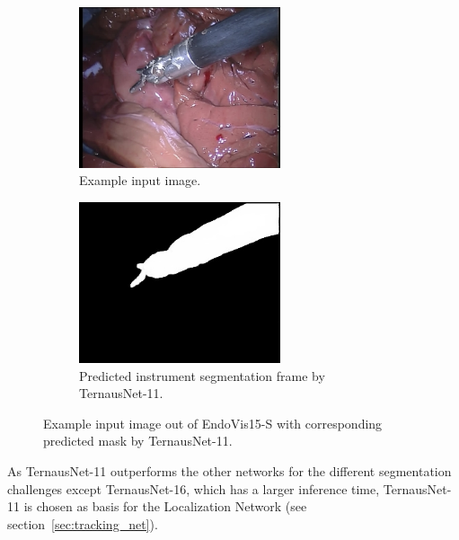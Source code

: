 \begin{figure}
\centering
\begin{subfigure}[t]{0.49\textwidth}
	\centering
	\includegraphics[width=0.65\textwidth]{images/predictions/model01/orig_Dataset2_frame006.jpg}
	\caption{Example input image.}
	\label{img:model01_dataset2_input_image}
\end{subfigure}
\begin{subfigure}[t]{0.49\textwidth}
	\centering
	\includegraphics[width=0.65\textwidth]{images/predictions/model01/Dataset2_model01_frame006_mask.jpg}
	\caption{Predicted instrument segmentation frame by TernausNet-11.}
	\label{img:model01_dataset2_good_pred}
\end{subfigure}
\caption[Example EndoVis15-S prediction]{Example input image out of EndoVis15-S with corresponding predicted mask by TernausNet-11.}
\label{img:example_segm_pred+gt_unet11}
\end{figure}

As TernausNet-11 outperforms the other networks for the different segmentation challenges except TernausNet-16, which has a larger inference time, TernausNet-11 is chosen as basis for the Localization Network (see section~\ref{sec:tracking_net}).
 

